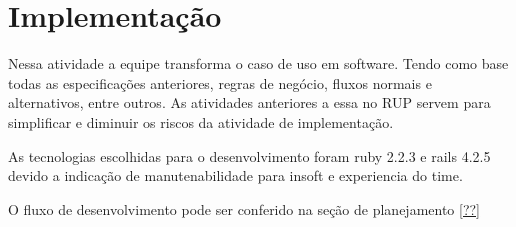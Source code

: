 \chapter{Implementação}

Nessa atividade a equipe transforma o caso de uso em software. Tendo como base todas as especificações anteriores, regras de negócio, fluxos normais e alternativos, entre outros. As atividades anteriores a essa no RUP servem para simplificar e diminuir os riscos da atividade de implementação.

As tecnologias escolhidas para o desenvolvimento foram ruby 2.2.3 e rails 4.2.5 devido a indicação de manutenabilidade para insoft e experiencia do time.

O fluxo de desenvolvimento pode ser conferido na seção de planejamento \ref{??}
